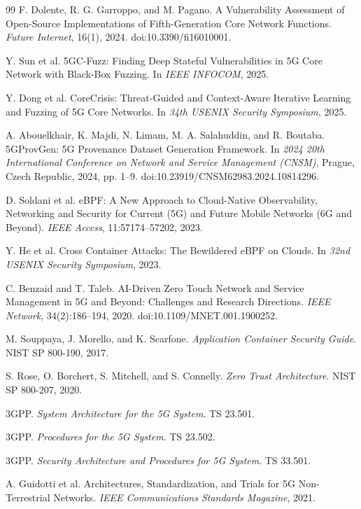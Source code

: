 \documentclass[sigconf,review]{acmart}
\begin{document}
\begin{thebibliography}{99}
F. Dolente, R. G. Garroppo, and M. Pagano. A Vulnerability Assessment of Open-Source Implementations of Fifth-Generation Core Network Functions. \emph{Future Internet}, 16(1), 2024. doi:10.3390/fi16010001.

Y. Sun et al. 5GC-Fuzz: Finding Deep Stateful Vulnerabilities in 5G Core Network with Black-Box Fuzzing. In \emph{IEEE INFOCOM}, 2025.

Y. Dong et al. CoreCrisis: Threat-Guided and Context-Aware Iterative Learning and Fuzzing of 5G Core Networks. In \emph{34th USENIX Security Symposium}, 2025.

A. Abouelkhair, K. Majdi, N. Limam, M. A. Salahuddin, and R. Boutaba. 5GProvGen: 5G Provenance Dataset Generation Framework. In \emph{2024 20th International Conference on Network and Service Management (CNSM)}, Prague, Czech Republic, 2024, pp. 1--9. doi:10.23919/CNSM62983.2024.10814296.

D. Soldani et al. eBPF: A New Approach to Cloud-Native Observability, Networking and Security for Current (5G) and Future Mobile Networks (6G and Beyond). \emph{IEEE Access}, 11:57174--57202, 2023.

Y. He et al. Cross Container Attacks: The Bewildered eBPF on Clouds. In \emph{32nd USENIX Security Symposium}, 2023.

C. Benzaid and T. Taleb. AI-Driven Zero Touch Network and Service Management in 5G and Beyond: Challenges and Research Directions. \emph{IEEE Network}, 34(2):186--194, 2020. doi:10.1109/MNET.001.1900252.

M. Souppaya, J. Morello, and K. Scarfone. \emph{Application Container Security Guide}. NIST SP 800-190, 2017.

S. Rose, O. Borchert, S. Mitchell, and S. Connelly. \emph{Zero Trust Architecture}. NIST SP 800-207, 2020.

3GPP. \emph{System Architecture for the 5G System}. TS 23.501.

3GPP. \emph{Procedures for the 5G System}. TS 23.502.

3GPP. \emph{Security Architecture and Procedures for 5G System}. TS 33.501.

A. Guidotti et al. Architectures, Standardization, and Trials for 5G Non-Terrestrial Networks. \emph{IEEE Communications Standards Magazine}, 2021.


\end{thebibliography}
\end{document}

